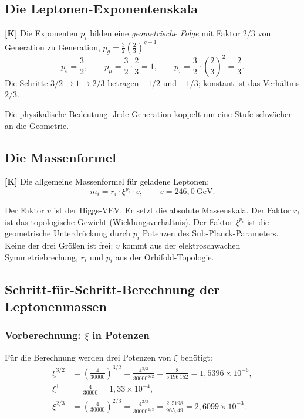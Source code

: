\subsection{Die Leptonen-Exponentenskala}

\textbf{[K]} Die Exponenten $p_i$ bilden eine \emph{geometrische Folge}
mit Faktor $2/3$ von Generation zu Generation, $p_g = \frac{3}{2}\left(\frac{2}{3}\right)^{g-1}$:
\begin{equation}
  p_e = \frac{3}{2},\qquad
  p_\mu = \frac{3}{2} \cdot \frac{2}{3} = 1,\qquad
  p_\tau = \frac{3}{2} \cdot \left(\frac{2}{3}\right)^{2} = \frac{2}{3}.
  \label{eq:expo_leiter}
\end{equation}
Die Schritte $3/2 \to 1 \to 2/3$ betragen $-1/2$ und $-1/3$; konstant
ist das Verhältnis $2/3$.

Die physikalische Bedeutung: Jede Generation koppelt um eine
Stufe schwächer an die Geometrie.

\subsection{Die Massenformel}

\textbf{[K]} Die allgemeine Massenformel für geladene Leptonen:
\begin{equation}
  m_i = r_i \cdot \xi^{p_i} \cdot v,
  \qquad v = 246{,}0~\text{GeV}.
  \label{eq:masse_lepton}
\end{equation}

Der Faktor $v$ ist der Higgs-VEV. Er setzt die absolute Massenskala.
Der Faktor $r_i$ ist das topologische Gewicht (Wicklungsverhältnis).
Der Faktor $\xi^{p_i}$ ist die geometrische Unterdrückung durch
$p_i$ Potenzen des Sub-Planck-Parameters. Keine der drei Größen
ist frei: $v$ kommt aus der elektroschwachen Symmetriebrechung,
$r_i$ und $p_i$ aus der Orbifold-Topologie.

\subsection{Schritt-für-Schritt-Berechnung der Leptonenmassen}

\subsubsection{Vorberechnung: $\xi$ in Potenzen}

Für die Berechnung werden drei Potenzen von $\xi$ benötigt:
\begin{align}
  \xi^{3/2} &= \left(\frac{4}{30000}\right)^{3/2}
             = \frac{4^{3/2}}{30000^{3/2}}
             = \frac{8}{5\,196\,152}
             = 1{,}5396 \times 10^{-6},
             \label{eq:xi32} \\
  \xi^{1}   &= \frac{4}{30000} = 1{,}3\overline{3} \times 10^{-4},
             \label{eq:xi1} \\
  \xi^{2/3} &= \left(\frac{4}{30000}\right)^{2/3}
             = \frac{4^{2/3}}{30000^{2/3}}
             = \frac{2{,}5198}{965{,}49}
             = 2{,}6099 \times 10^{-3}.
             \label{eq:xi23}
\end{align}


